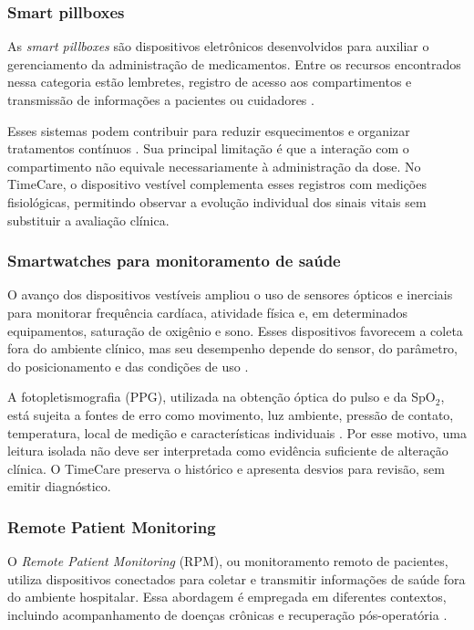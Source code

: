 \documentclass[12pt]{article}
\begin{document}
\subsubsection{Smart pillboxes}

As \textit{smart pillboxes} são dispositivos eletrônicos desenvolvidos para auxiliar o gerenciamento da administração de medicamentos. Entre os recursos encontrados nessa categoria estão lembretes, registro de acesso aos compartimentos e transmissão de informações a pacientes ou cuidadores \cite{shahani2022electronic}.

Esses sistemas podem contribuir para reduzir esquecimentos e organizar tratamentos contínuos \cite{shahani2022electronic}. Sua principal limitação é que a interação com o compartimento não equivale necessariamente à administração da dose. No TimeCare, o dispositivo vestível complementa esses registros com medições fisiológicas, permitindo observar a evolução individual dos sinais vitais sem substituir a avaliação clínica.

\subsubsection{Smartwatches para monitoramento de saúde}

O avanço dos dispositivos vestíveis ampliou o uso de sensores ópticos e inerciais para monitorar frequência cardíaca, atividade física e, em determinados equipamentos, saturação de oxigênio e sono. Esses dispositivos favorecem a coleta fora do ambiente clínico, mas seu desempenho depende do sensor, do parâmetro, do posicionamento e das condições de uso \cite{zhang2020validity}.

A fotopletismografia (PPG), utilizada na obtenção óptica do pulso e da SpO$_2$, está sujeita a fontes de erro como movimento, luz ambiente, pressão de contato, temperatura, local de medição e características individuais \cite{fine2021sources,ray2021review}. Por esse motivo, uma leitura isolada não deve ser interpretada como evidência suficiente de alteração clínica. O TimeCare preserva o histórico e apresenta desvios para revisão, sem emitir diagnóstico.

\subsubsection{Remote Patient Monitoring}

O \textit{Remote Patient Monitoring} (RPM), ou monitoramento remoto de pacientes, utiliza dispositivos conectados para coletar e transmitir informações de saúde fora do ambiente hospitalar. Essa abordagem é empregada em diferentes contextos, incluindo acompanhamento de doenças crônicas e recuperação pós-operatória \cite{vegesna2017remote}.
\end{document}
